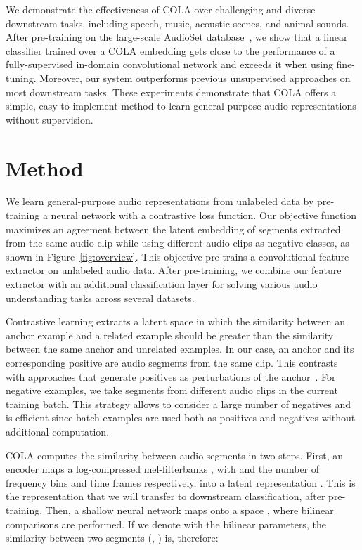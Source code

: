 \documentclass{article}
\newcommand{\ours}{COLA }
\begin{document}
We demonstrate the effectiveness of \ours over challenging and diverse downstream tasks, including speech, music, acoustic scenes, and animal sounds. After pre-training on the large-scale AudioSet database~\cite{gemmeke2017audio}, we show that a linear classifier trained over a \ours embedding gets close to the performance of a fully-supervised in-domain convolutional network and exceeds it when using fine-tuning. Moreover, our system outperforms previous unsupervised approaches on most downstream tasks. These experiments demonstrate that \ours offers a simple, easy-to-implement method to learn general-purpose audio representations without supervision.

\section{Method}
\label{sec:method}
We learn general-purpose audio representations from unlabeled data by pre-training a neural network with a contrastive loss function. 
Our objective function maximizes an agreement between the latent embedding of segments extracted from the same audio clip while using different audio clips as negative classes, as shown in Figure~\ref{fig:overview}. This objective pre-trains a convolutional feature extractor on unlabeled audio data. After pre-training, we combine our feature extractor with an additional classification layer for solving various audio understanding tasks across several datasets.

Contrastive learning extracts a latent space in which the similarity between an anchor example and a related example should be greater than the similarity between the same anchor and unrelated examples. In our case, an anchor and its corresponding positive are audio segments from the same clip. This contrasts with approaches that generate positives as perturbations of the anchor~\cite{wu2018unsupervised,kharitonov2020data}. For negative examples, we take segments from different audio clips in the current training batch. This strategy allows to consider a large number of negatives and is efficient since batch examples are used both as positives and negatives without additional computation.

\ours computes the similarity between audio segments in two steps. First, an encoder  maps a log-compressed mel-filterbanks , with  and  the number of frequency bins and time frames respectively, into a latent representation . This is the representation that we will transfer to downstream classification, after pre-training. Then, a shallow neural network  maps  onto a space , where bilinear comparisons are performed. If we denote with  the bilinear parameters, the similarity between two segments (, ) is, therefore:
\end{document}
